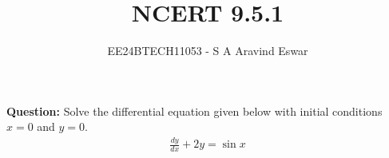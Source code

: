 \documentclass[journal]{IEEEtran}
\begin{document}

\vspace{3cm}

\title{NCERT 9.5.1}
\author{EE24BTECH11053 - S A Aravind Eswar}
{\let\newpage\relax\maketitle}

\renewcommand{\thefigure}{\theenumi}
\renewcommand{\thetable}{\theenumi}
\setlength{\intextsep}{10pt} %

\textbf{Question:} Solve the differential equation given below with initial conditions $ x = 0 $ and $ y = 0 $.
\begin{align}
	\frac{dy}{dx} + 2y = \sin{x}
\end{align}
\end{document}
